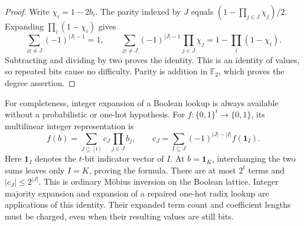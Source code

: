 \documentclass[11pt,letterpaper]{article}
\theoremstyle{definition}
\theoremstyle{remark}
\newcommand{\ind}{\mathbf 1}
\begin{document}
\begin{proof}
Write $\chi_i=1-2b_i$.  The parity indexed by $J$ equals
$(1-\prod_{j\in J}\chi_j)/2$.  Expanding
$\prod_i(1-\chi_i)$ gives
\[
 \sum_{\varnothing\ne J}(-1)^{|J|-1}=1,
 \qquad
 \sum_{\varnothing\ne J}(-1)^{|J|-1}\prod_{j\in J}\chi_j
 =1-\prod_i(1-\chi_i).
\]
Subtracting and dividing by two proves the identity.  This is an identity
of values, so repeated bits cause no difficulty.  Parity is addition in
$\mathbb F_2$, which proves the degree assertion.
\end{proof}

For completeness, integer expansion of a Boolean lookup is always
available without a probabilistic or one-hot hypothesis.  For
$f:\{0,1\}^t\to\{0,1\}$, its multilinear integer representation is
\[
 f(b)=\sum_{J\subseteq[t]}c_J\prod_{j\in J}b_j,
 \qquad
 c_J=\sum_{I\subseteq J}(-1)^{|J|-|I|}f(\ind_I).
\]
Here $\ind_I$ denotes the $t$-bit indicator vector of $I$.  At $b=\ind_K$,
interchanging the two sums leaves only $I=K$, proving the formula.
There are at most $2^t$ terms and $|c_J|\le2^{|J|}$.  This is ordinary
M\"obius inversion on the Boolean lattice.  Integer majority expansion
and expansion of a repaired one-hot radix lookup are applications of this
identity.  Their expanded term count and coefficient lengths must be
charged, even when their resulting values are still bits.
\end{document}

